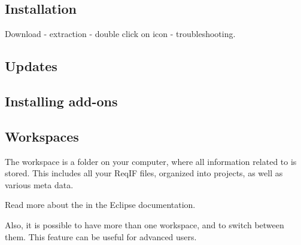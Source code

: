 \subsection{Installation}
\label{sec:installation}

Download - extraction - double click on icon - troubleshooting.

\subsection{Updates}
\label{sec:update}

\subsection{Installing add-ons}
\label{sec:install-add-on}

\subsection{Workspaces}

The workspace is a folder on your computer, where all information related to \pror{} is stored.  This includes all your ReqIF files, organized into projects, as well as various meta data.

\begin{info}
Read more about the  in the Eclipse documentation.

Also, it is possible to have more than one workspace, and to switch between them.  This feature can be useful for advanced users.
\end{info}

